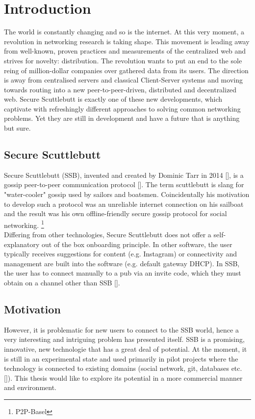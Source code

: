 \chapter{Introduction}
The world is constantly changing and so is the internet. At this very moment, a revolution in networking research is taking shape. This movement is leading away from well-known, proven practices and measurements of the centralized web and strives for novelty: distribution. The revolution wants to put an end to the sole reing of million-dollar companies over gathered data from its users. The direction is away from centralised servers and classical Client-Server systems and moving towards routing into a new peer-to-peer-driven, distributed and decentralized web. Secure Scuttlebutt is exactly one of these new developments, which captivate with refreshingly different approaches to solving common networking problems. Yet they are still in development and have a future that is anything but sure. 
\section{Secure Scuttlebutt}
Secure Scuttlebutt (SSB), invented and created by Dominic Tarr in 2014 [], is a gossip peer-to-peer communication protocol []. The term scuttlebutt is slang for "water-cooler" gossip used by sailors and boatsmen. Coincidentally his motivation to develop such a protocol was an unreliable internet connection on his sailboat and the result was his own offline-friendly secure gossip protocol for social networking. \footnote{P2P-Basel }\\

Differing from other technologies, Secure Scuttlebutt does not offer a self-explanatory out of the box onboarding principle. In other software, the user typically receives suggestions for content (e.g. Instagram) or connectivity and management are built into the software (e.g. default gateway DHCP). In SSB, the user has to connect manually to a pub via an invite code, which they must obtain on a channel other than SSB [].
\section{Motivation}
However, it is problematic for new users to connect to the SSB world, hence a very interesting and intriguing problem has presented itself. SSB is a promising, innovative, new technologie that has a great deal of potential. At the moment, it is still in an experimental state and used primarily in pilot projects where the technology is connected to existing domains (social network, git, databases etc. []). This thesis would like to explore its potential in a more commercial manner and environment. 

